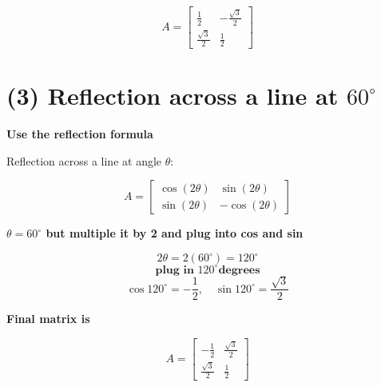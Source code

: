 \documentclass{ximera}
\begin{document}
\[
A =
\begin{bmatrix}
\frac{1}{2} & -\frac{\sqrt{3}}{2} \\
\frac{\sqrt{3}}{2} & \frac{1}{2}
\end{bmatrix}
\]

\section*{(3) Reflection across a line at $60^\circ$}

\textbf{Use the reflection formula}

Reflection across a line at angle $\theta$:

\[
A =
\begin{bmatrix}
\cos(2\theta) & \sin(2\theta) \\
\sin(2\theta) & -\cos(2\theta)
\end{bmatrix}
\]

\textbf{ $\theta = 60^\circ$ but multiple it by 2 and plug into cos and sin}

\[
2\theta = 2(60^\circ) = 120^\circ
\]
\[
\textbf{plug in } 120^\circ \textbf{degrees}
\]
\[
\cos 120^\circ = -\frac{1}{2}, \quad \sin 120^\circ = \frac{\sqrt{3}}{2}
\]

\textbf{Final matrix is}

\[
A =
\begin{bmatrix}
-\frac{1}{2} & \frac{\sqrt{3}}{2} \\
\frac{\sqrt{3}}{2} & \frac{1}{2}
\end{bmatrix}
\]
\end{document}
